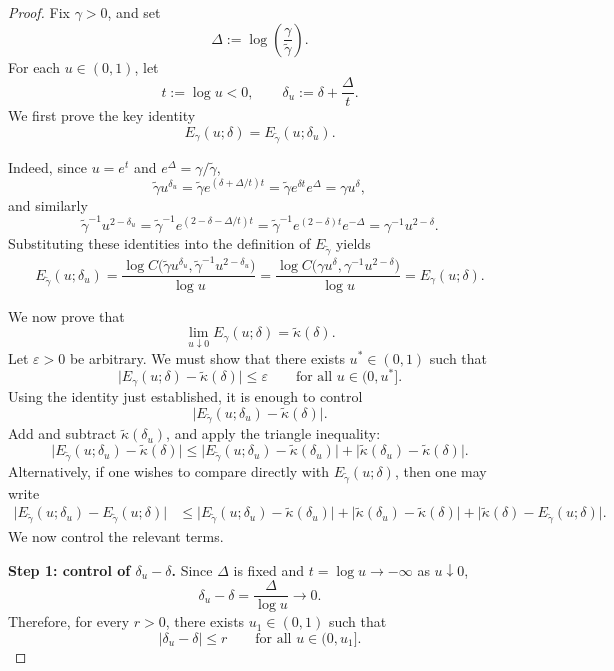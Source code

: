 \documentclass[11pt]{article}
\begin{document}
\begin{proof}
Fix \(\gamma>0\), and set
\[
\Delta:=\log\!\left(\frac{\gamma}{\tilde\gamma}\right).
\]
For each \(u\in(0,1)\), let
\[
t:=\log u<0,
\qquad
\delta_u:=\delta+\frac{\Delta}{t}.
\]
We first prove the key identity
\[
E_\gamma(u;\delta)=E_{\tilde\gamma}(u;\delta_u).
\]

Indeed, since \(u=e^t\) and \(e^\Delta=\gamma/\tilde\gamma\),
\[
\tilde\gamma u^{\delta_u}
=
\tilde\gamma e^{(\delta+\Delta/t)t}
=
\tilde\gamma e^{\delta t}e^\Delta
=
\gamma u^\delta,
\]
and similarly
\[
\tilde\gamma^{-1}u^{2-\delta_u}
=
\tilde\gamma^{-1}e^{(2-\delta-\Delta/t)t}
=
\tilde\gamma^{-1}e^{(2-\delta)t}e^{-\Delta}
=
\gamma^{-1}u^{2-\delta}.
\]
Substituting these identities into the definition of \(E_{\tilde\gamma}\) yields
\[
E_{\tilde\gamma}(u;\delta_u)
=
\frac{\log C\!\bigl(\tilde\gamma u^{\delta_u},\tilde\gamma^{-1}u^{2-\delta_u}\bigr)}{\log u}
=
\frac{\log C\!\bigl(\gamma u^\delta,\gamma^{-1}u^{2-\delta}\bigr)}{\log u}
=
E_\gamma(u;\delta).
\]

We now prove that
\[
\lim_{u\downarrow 0}E_\gamma(u;\delta)=\tilde{\kappa}(\delta).
\]
Let \(\varepsilon>0\) be arbitrary. We must show that there exists \(u^*\in(0,1)\) such that
\[
\bigl|E_\gamma(u;\delta)-\tilde{\kappa}(\delta)\bigr|\le \varepsilon
\qquad\text{for all }u\in(0,u^*].
\]
Using the identity just established, it is enough to control
\[
\bigl|E_{\tilde\gamma}(u;\delta_u)-\tilde{\kappa}(\delta)\bigr|.
\]
Add and subtract \(\tilde{\kappa}(\delta_u)\), and apply the triangle inequality:
\begin{equation}\label{eq:triangle}
\bigl|E_{\tilde\gamma}(u;\delta_u)-\tilde{\kappa}(\delta)\bigr|
\le
\bigl|E_{\tilde\gamma}(u;\delta_u)-\tilde{\kappa}(\delta_u)\bigr|
+
\bigl|\tilde{\kappa}(\delta_u)-\tilde{\kappa}(\delta)\bigr|.
\end{equation}
Alternatively, if one wishes to compare directly with \(E_{\tilde\gamma}(u;\delta)\), then one may write
\begin{align}
\bigl|E_{\tilde\gamma}(u;\delta_u)-E_{\tilde\gamma}(u;\delta)\bigr|
&\le
\bigl|E_{\tilde\gamma}(u;\delta_u)-\tilde{\kappa}(\delta_u)\bigr|
+
\bigl|\tilde{\kappa}(\delta_u)-\tilde{\kappa}(\delta)\bigr|
+
\bigl|\tilde{\kappa}(\delta)-E_{\tilde\gamma}(u;\delta)\bigr|.
\label{eq:full-triangle}
\end{align}
We now control the relevant terms.

\medskip
\noindent
\textbf{Step 1: control of \(\delta_u-\delta\).}
Since \(\Delta\) is fixed and \(t=\log u\to-\infty\) as \(u\downarrow 0\),
\[
\delta_u-\delta=\frac{\Delta}{\log u}\longrightarrow 0.
\]
Therefore, for every \(r>0\), there exists \(u_1\in(0,1)\) such that
\[
|\delta_u-\delta|\le r
\qquad\text{for all }u\in(0,u_1].
\]


\end{proof}
\end{document}
